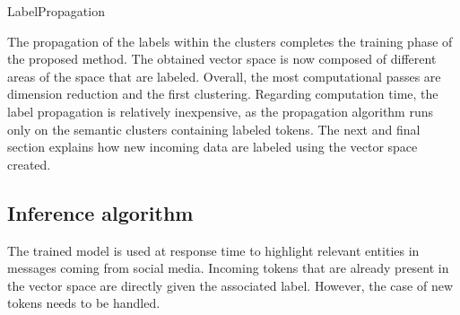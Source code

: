 \begin{algorithm}[htb]
    \DontPrintSemicolon
    \caption{LabelPropagation\label{alg:LP}}
\end{algorithm}

The propagation of the labels within the clusters completes the training phase of the proposed method.
The obtained vector space is now composed of different areas of the space that are labeled.
Overall, the most computational passes are dimension reduction and the first clustering.
Regarding computation time, the label propagation is relatively inexpensive, as the propagation algorithm runs only on the semantic clusters containing labeled tokens.
The next and final section explains how new incoming data are labeled using the vector space created.

\subsection{Inference algorithm}
The trained model is used at response time to highlight relevant entities in messages coming from social media.
Incoming tokens that are already present in the vector space are directly given the associated label.
However, the case of new tokens needs to be handled.

